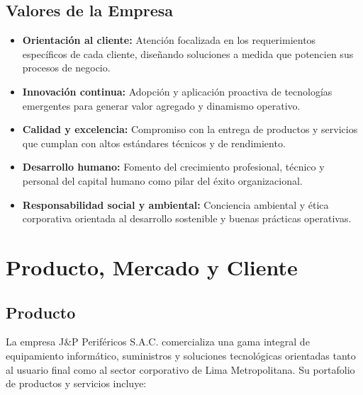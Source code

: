 \subsection{Valores de la Empresa}
\begin{itemize}
    \item \textbf{Orientación al cliente:} Atención focalizada en los requerimientos específicos de cada cliente, diseñando soluciones a medida que potencien sus procesos de negocio.
    \item \textbf{Innovación continua:} Adopción y aplicación proactiva de tecnologías emergentes para generar valor agregado y dinamismo operativo.
    \item \textbf{Calidad y excelencia:} Compromiso con la entrega de productos y servicios que cumplan con altos estándares técnicos y de rendimiento.
    \item \textbf{Desarrollo humano:} Fomento del crecimiento profesional, técnico y personal del capital humano como pilar del éxito organizacional.
    \item \textbf{Responsabilidad social y ambiental:} Conciencia ambiental y ética corporativa orientada al desarrollo sostenible y buenas prácticas operativas.
\end{itemize}

\section{Producto, Mercado y Cliente}

\subsection{Producto}
La empresa J\&P Periféricos S.A.C. comercializa una gama integral de equipamiento informático, 
suministros y soluciones tecnológicas orientadas tanto al usuario final como al sector corporativo de Lima Metropolitana. Su portafolio de productos y servicios incluye:

